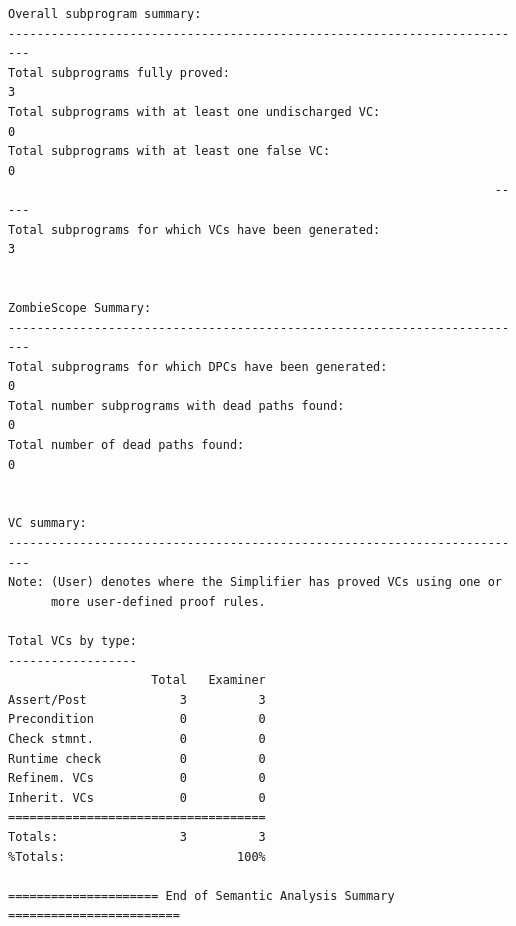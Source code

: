 \documentclass[a4paper, titlepage]{article}
\begin{document}
{\begin{lstlisting}
Overall subprogram summary:
-------------------------------------------------------------------------
Total subprograms fully proved:                                         3
Total subprograms with at least one undischarged VC:                    0
Total subprograms with at least one false VC:                           0
                                                                    -----
Total subprograms for which VCs have been generated:                    3


ZombieScope Summary:
-------------------------------------------------------------------------
Total subprograms for which DPCs have been generated:                   0
Total number subprograms with dead paths found:                         0
Total number of dead paths found:                                       0


VC summary:
-------------------------------------------------------------------------
Note: (User) denotes where the Simplifier has proved VCs using one or
      more user-defined proof rules.

Total VCs by type:
------------------
                    Total   Examiner
Assert/Post             3          3
Precondition            0          0
Check stmnt.            0          0
Runtime check           0          0
Refinem. VCs            0          0
Inherit. VCs            0          0
====================================
Totals:                 3          3
%Totals:                        100%

===================== End of Semantic Analysis Summary ========================

\end{lstlisting}
}
\end{document}
